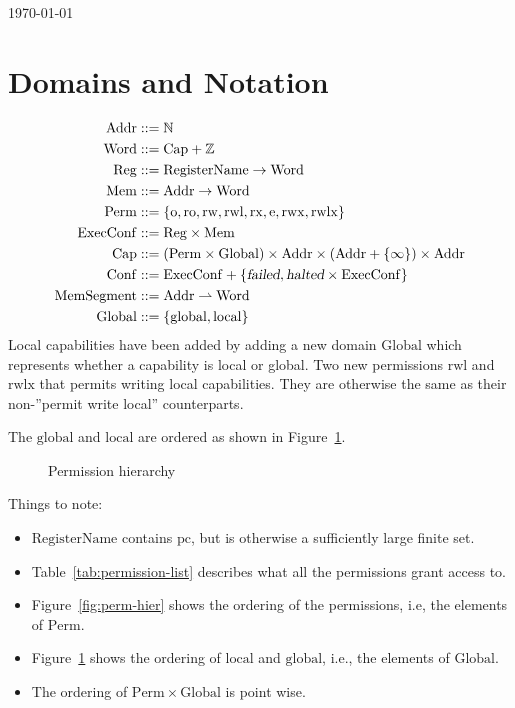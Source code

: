 \documentclass[a4paper]{article}
\newcommand{\parfun}{\rightharpoonup}
\newcommand{\pcreg}{\mathrm{pc}}
\newcommand{\failed}{\textsl{failed}}
\newcommand{\halted}{\textsl{halted}}
\newcommand{\plaindom}[1]{\mathrm{#1}}
\newcommand{\Caps}{\plaindom{Cap}}
\newcommand{\Words}{\plaindom{Word}}
\newcommand{\Addrs}{\plaindom{Addr}}
\newcommand{\ExecConfs}{\plaindom{ExecConf}}
\newcommand{\RegName}{\plaindom{RegisterName}}
\newcommand{\Regs}{\plaindom{Reg}}
\newcommand{\Heaps}{\plaindom{Mem}}
\newcommand{\HeapSegments}{\plaindom{MemSegment}}
\newcommand{\Confs}{\plaindom{Conf}}
\newcommand{\nats}{\mathbb{N}}
\newcommand{\ints}{\mathbb{Z}}
\newcommand{\Perms}{\plaindom{Perm}}
\newcommand{\Globals}{\plaindom{Global}}
\newcommand{\plainperm}[1]{\mathrm{#1}}
\newcommand{\noperm}{\plainperm{o}}
\newcommand{\readonly}{\plainperm{ro}}
\newcommand{\readwrite}{\plainperm{rw}}
\newcommand{\exec}{\plainperm{rx}}
\newcommand{\entry}{\plainperm{e}}
\newcommand{\rwx}{\plainperm{rwx}}
\newcommand{\readwritel}{\plainperm{rwl}}
\newcommand{\rwlx}{\plainperm{rwlx}}
\newcommand{\local}{\plainperm{local}}
\newcommand{\glob}{\plainperm{global}}
\begin{document}
\begin{flushright}
\today
\end{flushright}
\section{Domains and Notation}
\begin{align*}
\Addrs &::= \nats\\
\Words &::= \Caps + \ints \\
\Regs  &::= \RegName \rightarrow \Words\\
\Heaps &::= \Addrs \rightarrow \Words \\
\Perms &::= \{ \noperm, \readonly, \readwrite, \readwritel, \exec, \entry, \rwx, \rwlx\}\\
\ExecConfs  &::= \Regs \times \Heaps \\
\Caps  &::= (\Perms \times \Globals) \times \Addrs \times (\Addrs + \{ \infty \}) \times \Addrs\\
\Confs &::= \ExecConfs + \{\failed, \halted \times \ExecConfs\} \\
\HeapSegments &::= \Addrs \parfun \Words\\
\Globals & ::= \{\glob, \local \}
\end{align*}
Local capabilities have been added by adding a new domain $\Globals$ which represents whether a capability is local or global. Two new permissions $\readwritel$ and $\rwlx$ that permits writing local capabilities. They are otherwise the same as their non-''permit write local'' counterparts.

The $\glob$ and $\local$ are ordered as shown in Figure~\ref{fig:glob-hier}.
\begin{figure}[!h]
  \centering
\caption{Permission hierarchy}
\label{fig:glob-hier}
\end{figure}

Things to note:
\begin{itemize}
\item $\RegName$ contains $\pcreg$, but is otherwise a sufficiently
  large finite set.
\item Table~\ref{tab:permission-list} describes what all the permissions grant access to.
\item Figure~\ref{fig:perm-hier} shows the ordering of the permissions, i.e, the elements of $\Perms$.
\item Figure~\ref{fig:glob-hier} shows the ordering of $\local$ and $\glob$, i.e., the elements of $\Globals$.
\item The ordering of $\Perms \times \Globals$ is point wise.
\end{itemize}
\end{document}
